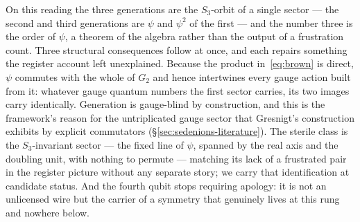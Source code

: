 On this reading the three generations are the $S_3$-orbit of a single sector --- the second and
third generations are $\psi$ and $\psi^{2}$ of the first --- and the number three is the order of
$\psi$, a theorem of the algebra rather than the output of a frustration count. Three structural
consequences follow at once, and each repairs something the register account left unexplained.
Because the product in~\eqref{eq:brown} is direct, $\psi$ commutes with the whole of $G_2$ and hence
intertwines every gauge action built from it: whatever gauge quantum numbers the first sector
carries, its two images carry identically. Generation is gauge-blind by construction, and this is
the framework's reason for the untriplicated gauge sector that Gresnigt's construction exhibits by
explicit commutators (\S\ref{sec:sedenions-literature}). The sterile class is the $S_3$-invariant
sector --- the fixed line of $\psi$, spanned by the real axis and the doubling unit, with nothing
to permute --- matching its lack of a frustrated pair in the register picture without any separate
story; we carry that identification at candidate status. And the fourth qubit stops requiring
apology: it is not an unlicensed wire but the carrier of a symmetry that genuinely lives at this
rung and nowhere below.

